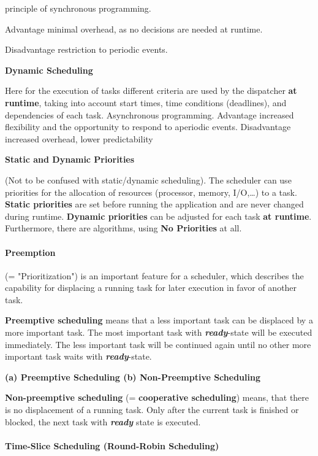  principle of synchronous programming.

Advantage  minimal overhead, as no decisions are needed at runtime. 

Disadvantage  restriction to periodic events.

\textbf{Dynamic Scheduling}

Here for the execution of tasks different criteria are used by the dispatcher \textbf{at runtime}, taking into account start times, time conditions (deadlines), and dependencies of each task. Asynchronous programming. Advantage  increased flexibility and the opportunity to respond to aperiodic events. Disadvantage  increased overhead, lower predictability

\textbf{Static and Dynamic Priorities}

(Not to be confused with static/dynamic scheduling). The scheduler can use priorities for the allocation of resources (processor, memory, I/O,{\dots}) to a task. \textbf{Static priorities} are set before running the application and are never changed during runtime. \textbf{Dynamic priorities} can be adjusted for each task \textbf{at runtime}. Furthermore, there are algorithms, using \textbf{No Priorities} at all. 

\paragraph{ Preemption}

(= "Prioritization") is an important feature for a scheduler, which describes the capability for displacing a running task for later execution in favor of another task. 

\textbf{Preemptive scheduling }means that a less important task can be displaced by a more important task. The most important task with \textbf{\textit{ready}}-state will be executed immediately. The less important task will be continued again until no other more important task waits with \textbf{\textit{ready}}-state.

\textbf{(a) Preemptive Scheduling          (b) Non-Preemptive Scheduling }

\textbf{Non-preemptive scheduling} (= \textbf{cooperative scheduling}) means, that there is no displacement of a running task. Only after the current task is finished or blocked, the next task with \textbf{\textit{ready}} state is executed.


\paragraph{  Time-Slice Scheduling (Round-Robin Scheduling)}

